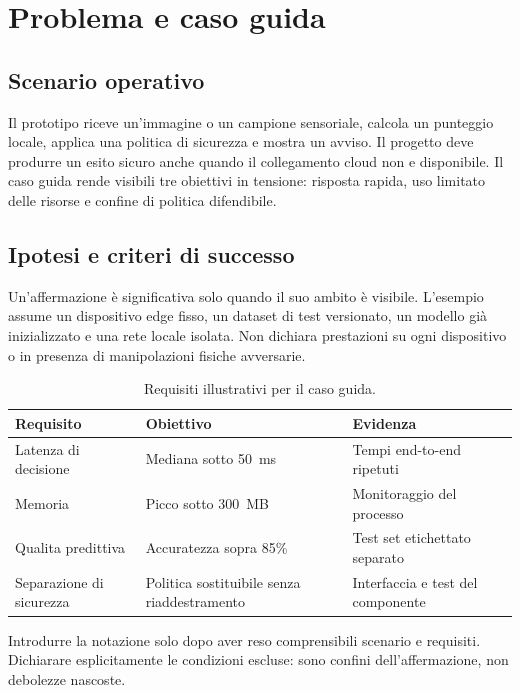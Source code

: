 \chapter{Problema e caso guida}\label{ch:b-problem}
\section{Scenario operativo}
Il prototipo riceve un'immagine o un campione sensoriale, calcola un punteggio locale, applica una politica di sicurezza e mostra un avviso. Il progetto deve produrre un esito sicuro anche quando il collegamento cloud non e disponibile. Il caso guida rende visibili tre obiettivi in tensione: risposta rapida, uso limitato delle risorse e confine di politica difendibile.

\section{Ipotesi e criteri di successo}
Un'affermazione è significativa solo quando il suo ambito è visibile. L'esempio assume un dispositivo edge fisso, un dataset di test versionato, un modello già inizializzato e una rete locale isolata. Non dichiara prestazioni su ogni dispositivo o in presenza di manipolazioni fisiche avversarie.

\begin{table}[htbp]
\centering
\caption{Requisiti illustrativi per il caso guida.}
\label{tab:b-requirements}
\begin{tabularx}{0.9\textwidth}{YYY}
\toprule
Requisito & Obiettivo & Evidenza\\
\midrule
Latenza di decisione & Mediana sotto 50~ms & Tempi end-to-end ripetuti\\
Memoria & Picco sotto 300~MB & Monitoraggio del processo\\
Qualita predittiva & Accuratezza sopra 85\% & Test set etichettato separato\\
Separazione di sicurezza & Politica sostituibile senza riaddestramento & Interfaccia e test del componente\\
\bottomrule
\end{tabularx}
\end{table}

\begin{keypoint}
Introdurre la notazione solo dopo aver reso comprensibili scenario e requisiti. Dichiarare esplicitamente le condizioni escluse: sono confini dell'affermazione, non debolezze nascoste.
\end{keypoint}

